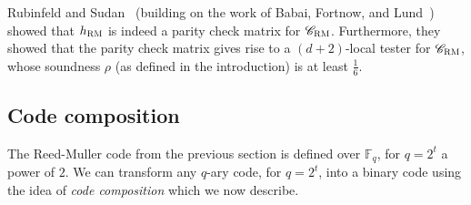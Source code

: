 \documentclass[11pt]{article}
\newtheorem{theorem}{Theorem}[section]
\theoremstyle{definition}
\newcommand{\code}{\mathscr{C}}
\newcommand{\F}{\ensuremath{\mathbb{F}}}
\newcommand{\mX}{\ensuremath{\mathcal{X}}}
\newcommand{\RM}{\ensuremath{\textsc{RM}}}
\DeclareMathOperator{\poly}{poly}
\newcommand{\eps}{\varepsilon}
\DeclareMathOperator{\tr}{tr}
\begin{document}
Rubinfeld and Sudan~\cite{rubinfeld1996robust} (building on the work of Babai, Fortnow, and Lund~\cite{babai1991non}) showed that $h_{\RM}$ is indeed a parity check matrix for $\code_{\RM}$. Furthermore, they showed that the parity check matrix gives rise to a $(d+2)$-local tester for $\code_{\RM}$, whose soundness $\rho$ (as defined in the introduction) is at least $\frac{1}{6}$. 




\subsection{Code composition}
\label{sec:code-comp}

 The Reed-Muller code from the previous section is defined over $\F_q$, for $q=2^t$ a power of $2$. We can transform any $q$-ary code, for $q=2^t$, into a binary code using the idea of \emph{code composition} which we now describe. 



\end{document}
